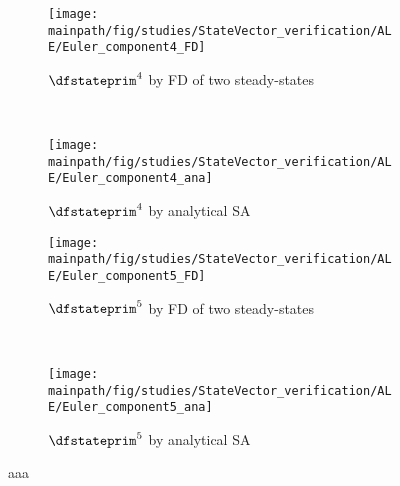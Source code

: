 \documentclass[../main.tex]{subfiles}
\begin{document}
\begin{figure}[t!]
   
    \begin{subfigure}[t]{0.5\textwidth}
        \centering
        \texttt{[image: \\mainpath/fig/studies/StateVector\_verification/ALE/Euler\_component4\_FD]}
        \caption{$\dfstateprim^4$ by \ac{FD} of two steady-states}
    \end{subfigure}%
    ~ 
    \begin{subfigure}[t]{0.5\textwidth}
        \centering
        \texttt{[image: \\mainpath/fig/studies/StateVector\_verification/ALE/Euler\_component4\_ana]}
        \caption{$\dfstateprim^4$ by analytical \ac{SA}}
    \end{subfigure}
    
    
    \begin{subfigure}[t]{0.5\textwidth}
        \centering
        \texttt{[image: \\mainpath/fig/studies/StateVector\_verification/ALE/Euler\_component5\_FD]}
        \caption{$\dfstateprim^5$ by \ac{FD} of two steady-states}
    \end{subfigure}%
    ~ 
    \begin{subfigure}[t]{0.5\textwidth}
        \centering
        \texttt{[image: \\mainpath/fig/studies/StateVector\_verification/ALE/Euler\_component5\_ana]}
        \caption{$\dfstateprim^5$ by analytical \ac{SA}}
    \end{subfigure}
    \caption[aaa]{aaa}
    \label{fig:dwds_verification_ale_euler}
    
\end{figure}
\end{document}
